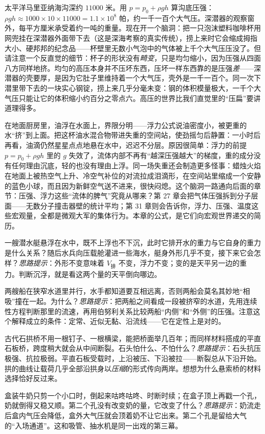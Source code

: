 
\begin{thought}[把泡沫塑料杯沉入海底一万米]
太平洋马里亚纳海沟深约 \(11000\) 米。用 \(p=p_{0}+\rho g h\) 算沟底压强：\(\rho g h\approx1000\times10\times11000=1.1\times10^{8}\) 帕，约一千一百个大气压。深潜器的观察窗外，每平方厘米承受着约一吨的重量。现在开一个脑洞：把一只泡沫塑料咖啡杯用网兜挂在深潜器外面带下去（这是深海考察的真实传统），捞上来时它会缩成拇指大小、硬邦邦的纪念品——杯壁里无数小气泡中的气体被上千个大气压压没了。但请注意一个反直觉的细节：杯子的形状没有\emph{畸变}，只是均匀缩小，因为压强从四面八方同样地挤。均匀的高压本身并不压坏东西，压坏一样东西靠的是压强\emph{差}——深潜器的壳要厚，是因为它肚子里维持着一个大气压，壳外是一千一百个。同一次下潜里带下去的一块实心钢锭，捞上来几乎分毫未变：钢的体积模量极大，一千个大气压只能让它的体积缩小约百分之零点六。高压的世界比我们直觉里的“压扁”要讲道理得多。
\end{thought}

\begin{thought}
在地面厨房里，油浮在水面上，界限分明——浮力公式说油密度小，被更重的水“挤”到上面。把这杯油水混合物带进失重的空间站，使劲摇匀后静置：一小时后再看，油滴仍然星星点点地悬在水中，迟迟不分层。原因很简单：浮力的前提 \(p=p_{0}+\rho g h\) 里的 \(g\) 失效了，流体内部不再有“越深压强越大”的梯度，重的成分没有任何理由沉底，轻的也没有理由上浮。同一场失重还会制造更多怪事：蜡烛火焰在地面上被热空气上升、冷空气补位的对流拉成泪滴形，在空间站里缩成一个安静的蓝色小球，而且因为新鲜空气送不进来，很快闷熄。这个脑洞一路通向后面的章节：压强、浮力这些“流体的脾气”究竟从哪来？第 27 章会把气体压强拆到分子层面——无数分子撞击器壁的统计平均；第 31 章则会告诉你，浮力、压强、温度这些宏观量，全都是微观大军的集体行为。本章的公式，是它们向宏观世界递交的简历。
\end{thought}

\begin{puzzles}
\item 一艘潜水艇悬浮在水中，既不上浮也不下沉，此时它排开水的重力与它自身的重力是什么关系？随后水兵向压载舱灌进一些海水，艇身外形几乎不变，接下来它会怎样？\emph{思路提示}：外形不变意味着 \(V_{\text{排}}\) 不变，浮力不变；变的是天平另一边的重力。判断沉浮，就是看这两个量的天平倒向哪边。
\item 两艘船在狭窄水道里并行，水手都知道要互相远离，否则两船会莫名其妙地“相吸”撞在一起。为什么？\emph{思路提示}：把两船之间看成一段被挤窄的水道，先用连续性方程判断那里的流速，再用伯努利关系比较两船“内侧”和“外侧”的压强。注意这个解释成立的条件：定常、近似无黏、沿流线——它在定性上是对的。
\item 古代石拱桥不用一根钉子、一根横梁，能把桥面举几百年；而同样材料搭成的平直石板桥，跨度稍大就会从中间断裂。石头怕什么、不怕什么？\emph{思路提示}：石头抗压极强、抗拉极弱。平直石板受载时，上沿被压、下沿被拉——断裂总从下沿开始。拱的曲线让载荷几乎全部沿拱身以\emph{压缩}的形式传向两岸。想想为什么悬索桥的材料选择恰好反过来。
\item 盒装牛奶只剪一个小口时，倒起来咕咚咕咚、时断时续；在盒子顶上再戳一个孔，奶就倒得又稳又顺。第二个孔没有改变奶的量，它改变了什么？\emph{思路提示}：奶流走后盒内气压会降低，盒外大气压就会顶着奶不让它出来。第二个孔是留给大气的“入场通道”。这和吸管、抽水机是同一出戏的第三幕。
\end{puzzles}

